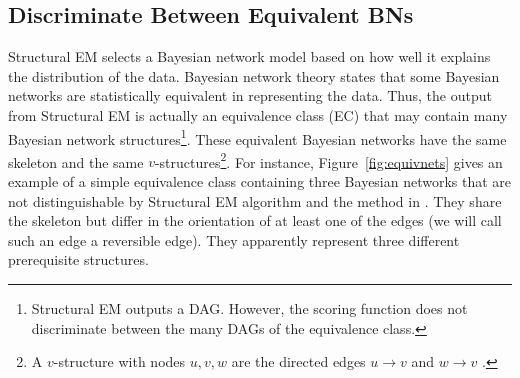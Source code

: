\documentclass{edm_template}
\begin{document}


\subsection{Discriminate Between Equivalent BNs}
\label{sec:discriminatebns}

Structural EM selects a Bayesian network model based on how well it explains the distribution of the data. 
Bayesian network theory states that some Bayesian networks are statistically equivalent in representing the data.
Thus, the output from Structural EM is actually an equivalence class (EC) that may contain many Bayesian network structures\footnote{Structural EM outputs a DAG. However,  the scoring function  does not discriminate between the many DAGs of the equivalence class.}.
These equivalent Bayesian networks have the same skeleton and the same $v$-structures\footnote{A $v$-structure with nodes $u,v,w$ are the directed edges $u\rightarrow v$ and $w\rightarrow v$ \cite{verma1990equivalence}.}. 
For instance, Figure~\ref{fig:equivnets} gives an example of a simple equivalence class containing three Bayesian networks 
that are not distinguishable by Structural EM algorithm and the method in \cite{scheines2014discovering}.
They share the skeleton but differ in the orientation of at least one of the edges (we will call such an edge a reversible edge). 
They apparently represent three different prerequisite structures.
\end{document}
